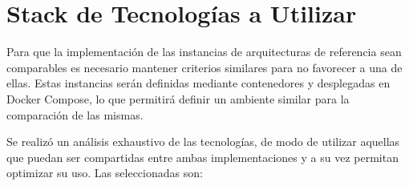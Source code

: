 \section{Stack de Tecnologías a Utilizar}

Para que la implementación de las instancias de arquitecturas de referencia sean comparables es necesario mantener criterios similares para no favorecer a una de ellas.
Estas instancias serán definidas mediante contenedores y desplegadas en Docker Compose, 
lo que permitirá definir un ambiente similar para la comparación de las mismas.\newline

Se realizó un análisis exhaustivo de las tecnologías, de modo de utilizar aquellas que puedan ser compartidas entre ambas implementaciones y a su vez permitan
optimizar su uso. Las seleccionadas son: 


